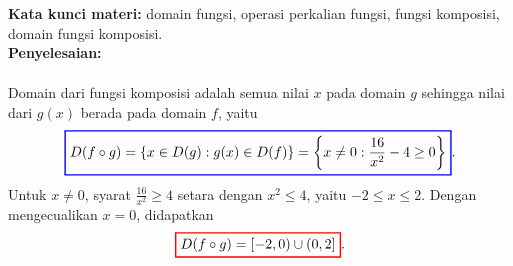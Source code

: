 \documentclass[10pt,openany,a4paper]{article}
\theoremstyle{definition}
\theoremstyle{definition}
\theoremstyle{plain}
\newenvironment{jawab}[2][tes]{%
\par\noindent\textbf{Kata kunci materi:} #1.\\
\textbf{Penyelesaian:} #2%
}{}
\begin{document}
\begin{enumerate}
\begin{jawab}[domain fungsi, operasi perkalian fungsi, fungsi komposisi, domain fungsi komposisi]
{\begin{enumerate}
\begin{align*}
            \end{align*}
            Domain dari fungsi komposisi adalah semua nilai $x$ pada domain $g$ sehingga nilai dari $g(x)$ berada pada domain $f$, yaitu
            \begin{align*}
                \colorlet{oldcolor}{.}
        \color{blue}
        \setlength{\fboxrule}{1pt} \boxed{\color{oldcolor}D(f\circ g) = \{x \in D(g) : g(x) \in D(f)\} = \left\{x\neq 0 : \frac{16}{x^2}-4\geq 0\right\}}\color{oldcolor}.
            \end{align*}
            Untuk $x\neq 0$, syarat $\frac{16}{x^2}\geq 4$ setara dengan $x^2\leq 4$, yaitu $-2\leq x\leq 2$. Dengan mengecualikan $x=0$, didapatkan
            \begin{align*}
                \colorlet{oldcolor}{.}
        \color{red}
        \setlength{\fboxrule}{1pt} \boxed{\color{oldcolor}D(f\circ g) = [-2,0)\cup(0,2]}\color{oldcolor}.
            \end{align*}
        \end{enumerate}
    }
    \end{jawab}


\end{enumerate}
\end{document}
